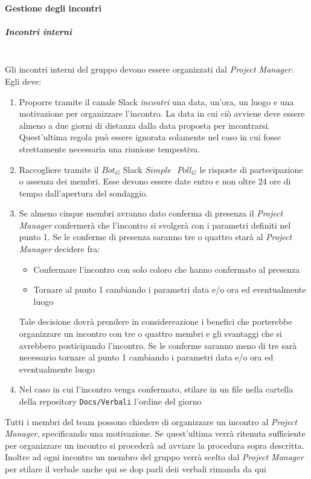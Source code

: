 		\paragraph{Gestione degli incontri}
			\subparagraph{Incontri interni} \mbox{} \\
			 Gli incontri interni del gruppo devono essere organizzati dal \emph{Project Manager}. Egli deve:
			\begin{enumerate}
				\item Proporre tramite il canale Slack \emph{incontri} una data, un'ora, un luogo e una motivazione per organizzare l'incontro. La data in cui ciò avviene deve essere almeno a due giorni di distanza dalla data proposta per incontrarsi. Quest'ultima regola può essere ignorata solamente nel caso in cui fosse strettamente necessaria una riunione tempestiva.
				
				\item Raccogliere tramite il $Bot_G$ Slack $Simple\textbf{ }Poll_G$ le risposte di partecipazione o assenza dei membri. Esse devono essere date entro e non oltre 24 ore di tempo dall'apertura del sondaggio.
				
				\item Se almeno cinque membri avranno dato conferma di presenza il \emph{Project Manager} confermerà che l'incontro si svolgerà con i parametri definiti nel punto 1. 
				Se le conferme di presenza saranno tre o quattro starà al \emph{Project Manager} decidere fra: 
				\begin{itemize}
					\item Confermare l'incontro con solo coloro che hanno confermato al presenza
					\item Tornare al punto 1 cambiando i parametri data e/o ora ed eventualmente luogo
				\end{itemize}
				Tale decisione dovrà prendere in considereazione i benefici che porterebbe organizzare un incontro con tre o quattro membri e gli svantaggi che si avrebbero posticipando l'incontro.
				Se le conferme saranno meno di tre sarà necessario tornare al punto 1 cambiando i parametri data e/o ora ed eventualmente luogo
				
				\item Nel caso in cui l'incontro venga confermato, stilare in un file nella cartella della repository \texttt{Docs/Verbali} l'ordine del giorno \color{red}{qui spiega meglio quando avrai materiale}
			\end{enumerate}
			Tutti i membri del team possono chiedere di organizzare un incontro al \emph{Project Manager}, specificando una motivazione. Se quest'ultima verrà ritenuta sufficiente per organizzare un incontro si procederà ad avviare la procedura sopra descritta. \\Inoltre ad ogni incontro un membro del gruppo verrà scelto dal \emph{Project Manager} per stilare il verbale anche qui se dop parli deii verbali rimanda da qui
			
